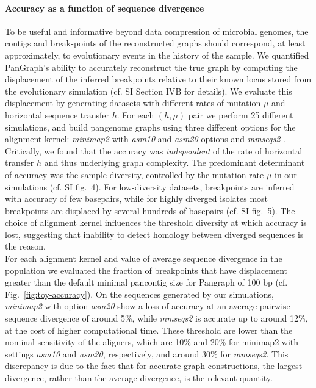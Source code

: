 \documentclass[aps,rmp,preprint,superscriptaddress,10pt,linenumbers]{revtex4-1}
\newcommand{\SIsimBench}{IV}
\newcommand{\SIfigMutrate}{4}
\newcommand{\SIfigKernels}{5}
\begin{document}
\paragraph*{Accuracy as a function of sequence divergence}
To be useful and informative beyond data compression of microbial genomes, the contigs and break-points of the reconstructed graphs should correspond, at least approximately, to evolutionary events in the history of the sample.
We quantified PanGraph's ability to accurately reconstruct the true graph by computing the displacement of the inferred breakpoints relative to their known locus stored from the evolutionary simulation (cf. SI Section {\SIsimBench}B for details). We evaluate this displacement by generating datasets with different rates of mutation $\mu$ and horizontal sequence transfer $h$. For each $(h,\mu)$ pair we perform 25 different simulations, and build pangenome graphs using three different options for the alignment kernel: \textit{minimap2} \cite{li2018minimap2} with \textit{asm10} and \textit{asm20} options and \textit{mmseqs2} \cite{steinegger2017mmseqs2}.
Critically, we found that the accuracy was \emph{independent} of the rate of horizontal transfer $h$ and thus underlying graph complexity.
The predominant determinant of accuracy was the sample diversity, controlled by the mutation rate $\mu$ in our simulations (cf. SI fig.~\SIfigMutrate). For low-diversity datasets, breakpoints are inferred with accuracy of few basepairs, while for highly diverged isolates most breakpoints are displaced by several hundreds of basepairs (cf. SI fig.~\SIfigKernels). The choice of alignment kernel influences the threshold diversity at which accuracy is lost, suggesting that inability to detect homology between diverged sequences is the reason.\\
For each alignment kernel and value of average sequence divergence in the population we evaluated the fraction of breakpoints that have displacement greater than the default minimal pancontig size for Pangraph of 100 bp (cf. Fig.~\ref{fig:toy-accuracy}). On the sequences generated by our simulations, \textit{minimap2} with option \textit{asm20} show a loss of accuracy at an average pairwise sequence divergence of around 5\%, while \textit{mmseqs2} is accurate up to around 12\%, at the cost of higher computational time.
These threshold are lower than the nominal sensitivity of the aligners, which are 10\% and 20\% for minimap2 with settings \textit{asm10} and \textit{asm20}, respectively, and around 30\% for \textit{mmseqs2}.
This discrepancy is due to the fact that for accurate graph constructions, the largest divergence, rather than the average divergence, is the relevant quantity.
\end{document}
